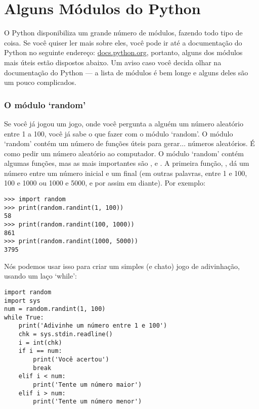 

\chapter{Alguns Módulos do Python}\label{app:afewpythonmodules}

O Python disponibiliza um grande número de módulos, fazendo todo tipo de coisa. Se você quiser ler mais sobre eles, você pode ir até a documentação do Python no seguinte endereço: \href{http://docs.python.org}{docs.python.org}, portanto, alguns dos módulos mais úteis estão dispostos abaixo. Um aviso caso você decida olhar na documentação do Python --- a lista de módulos é bem longe e alguns deles são um pouco complicados.

\subsection*{O módulo `random'}

Se você já jogou um jogo, onde você pergunta a alguém um número aleatório entre 1 a 100, você já sabe o que fazer com o módulo `random'. O módulo `random' contém um número de funções úteis para gerar$\ldots$ números aleatórios. É como pedir um número aleatório ao computador. O módulo `random' contém algumas funções, mas as mais importantes são ,  e . A primeira função, , dá um número entre um número inicial e um final (em outras palavras, entre 1 e 100, 100 e 1000 ou 1000 e 5000, e por assim em diante). Por exemplo:

\begin{listingignore}
\begin{verbatim}
>>> import random
>>> print(random.randint(1, 100))
58
>>> print(random.randint(100, 1000))
861
>>> print(random.randint(1000, 5000))
3795
\end{verbatim}
\end{listingignore}

Nós podemos usar isso para criar um simples (e chato) jogo de adivinhação, usando um laço `while':

\begin{listingignore}
\begin{verbatim}
import random
import sys
num = random.randint(1, 100)
while True:
    print('Adivinhe um número entre 1 e 100')
    chk = sys.stdin.readline()
    i = int(chk)
    if i == num:
        print('Você acertou')
        break
    elif i < num:
        print('Tente um número maior')
    elif i > num:
        print('Tente um número menor')
\end{verbatim}
\end{listingignore}

